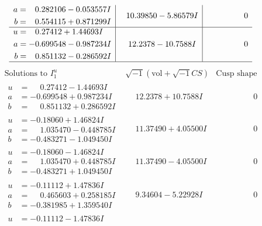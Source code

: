\documentclass[1p]{elsarticle_modified}
\theoremstyle{definition}
\newcommand{\I}{\sqrt{-1}}
\begin{document}
$$\begin{array}{c|c|c}
\begin{aligned}
a &= \phantom{-}0.282106 - 0.053557 I \\
b &= \phantom{-}0.554115 + 0.871299 I\end{aligned}
 & \phantom{-}10.39850 - 5.86579 I & \phantom{-0.000000 } 0 \\ \hline\begin{aligned}
u &= \phantom{-}0.27412 + 1.44693 I \\
a &= -0.699548 - 0.987234 I \\
b &= \phantom{-}0.851132 - 0.286592 I\end{aligned}
 & \phantom{-}12.2378 - 10.7588 I & \phantom{-0.000000 } 0\\
 \hline 
 \end{array}$$\newpage$$\begin{array}{c|c|c}  
\text{Solutions to }I^u_{1}& \I (\text{vol} + \sqrt{-1}CS) & \text{Cusp shape}\\
 \hline 
\begin{aligned}
u &= \phantom{-}0.27412 - 1.44693 I \\
a &= -0.699548 + 0.987234 I \\
b &= \phantom{-}0.851132 + 0.286592 I\end{aligned}
 & \phantom{-}12.2378 + 10.7588 I & \phantom{-0.000000 } 0 \\ \hline\begin{aligned}
u &= -0.18060 + 1.46824 I \\
a &= \phantom{-}1.035470 - 0.448785 I \\
b &= -0.483271 - 1.049450 I\end{aligned}
 & \phantom{-}11.37490 + 4.05500 I & \phantom{-0.000000 } 0 \\ \hline\begin{aligned}
u &= -0.18060 - 1.46824 I \\
a &= \phantom{-}1.035470 + 0.448785 I \\
b &= -0.483271 + 1.049450 I\end{aligned}
 & \phantom{-}11.37490 - 4.05500 I & \phantom{-0.000000 } 0 \\ \hline\begin{aligned}
u &= -0.11112 + 1.47836 I \\
a &= \phantom{-}0.465603 + 0.258185 I \\
b &= -0.381985 + 1.359540 I\end{aligned}
 & \phantom{-}9.34604 - 5.22928 I & \phantom{-0.000000 } 0 \\ \hline\begin{aligned}
u &= -0.11112 - 1.47836 I \\

\end{aligned}
\end{array}$$
\end{document}
